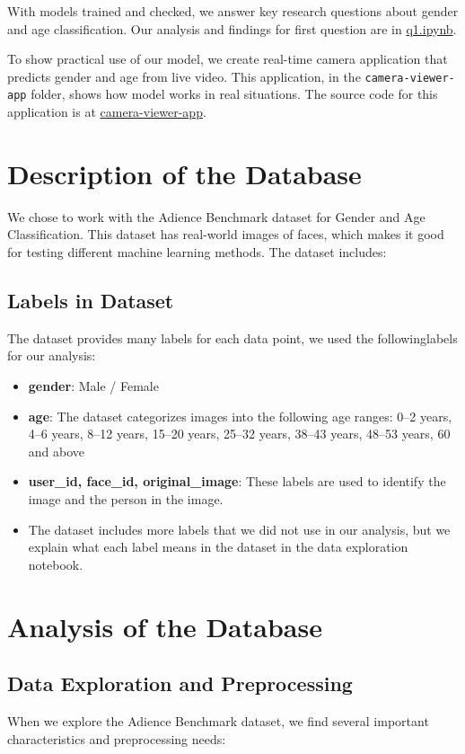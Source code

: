 \documentclass{article}
\begin{document}
With models trained and checked, we answer key research questions about gender and age classification. Our analysis and findings for first question are in \href{https://github.com/ShayGali/VisAge/blob/main/questions/q1.ipynb}{q1.ipynb}.

To show practical use of our model, we create real-time camera application that predicts gender and age from live video. This application, in the \texttt{camera-viewer-app} folder, shows how model works in real situations. The source code for this application is at \href{https://github.com/ShayGali/VisAge/tree/main/camera-viewer-app}{camera-viewer-app}.

\section{Description of the Database}
We chose to work with the Adience Benchmark dataset for Gender and Age Classification\cite{adience_dataset}. This dataset has real-world images of faces, which makes it good for testing different machine learning methods. The dataset includes:

\subsection*{Labels in Dataset}
The dataset provides many labels for each data point, we used the followinglabels for our analysis:
\begin{itemize}[leftmargin=1.6cm]
    \item \textbf{gender}: Male / Female
    \item \textbf{age}: The dataset categorizes images into the following age ranges: 0--2 years, 4--6 years, 8--12 years, 15--20 years, 25--32 years, 38--43 years, 48--53 years, 60 and above
    \item \textbf{user\_id, face\_id, original\_image}: These labels are used to identify the image and the person in the image.
    \item The dataset includes more labels that we did not use in our analysis, but we explain what each label means in the dataset in the {data exploration notebook}\cite{github_repo}.
\end{itemize}
\section{Analysis of the Database}

\subsection{Data Exploration and Preprocessing}
When we explore the Adience Benchmark dataset, we find several important characteristics and preprocessing needs:
\end{document}
